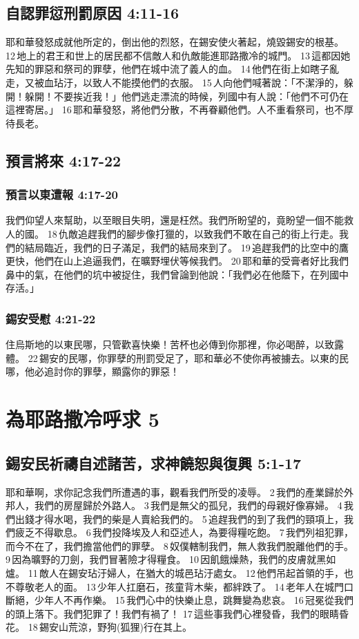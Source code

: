 \subsection{自認罪愆刑罰原因 4:11-16}
耶和華發怒成就他所定的，倒出他的烈怒，在錫安使火著起，燒毀錫安的根基。 12 地上的君王和世上的居民都不信敵人和仇敵能進耶路撒冷的城門。 13 這都因她先知的罪惡和祭司的罪孽，他們在城中流了義人的血。 14 他們在街上如瞎子亂走，又被血玷汙，以致人不能摸他們的衣服。 15 人向他們喊著說：「不潔淨的，躲開！躲開！不要挨近我！」他們逃走漂流的時候，列國中有人說：「他們不可仍在這裡寄居。」 16 耶和華發怒，將他們分散，不再眷顧他們。人不重看祭司，也不厚待長老。

\subsection{預言將來 4:17-22}
\subsubsection{預言以東遭報 4:17-20}
我們仰望人來幫助，以至眼目失明，還是枉然。我們所盼望的，竟盼望一個不能救人的國。 18 仇敵追趕我們的腳步像打獵的，以致我們不敢在自己的街上行走。我們的結局臨近，我們的日子滿足，我們的結局來到了。 19 追趕我們的比空中的鷹更快，他們在山上追逼我們，在曠野埋伏等候我們。 20 耶和華的受膏者好比我們鼻中的氣，在他們的坑中被捉住，我們曾論到他說：「我們必在他蔭下，在列國中存活。」

\subsubsection{錫安受慰 4:21-22}
住烏斯地的以東民哪，只管歡喜快樂！苦杯也必傳到你那裡，你必喝醉，以致露體。 22 錫安的民哪，你罪孽的刑罰受足了，耶和華必不使你再被擄去。以東的民哪，他必追討你的罪孽，顯露你的罪惡！

\section{為耶路撒冷呼求 5}
\subsection{錫安民祈禱自述諸苦，求神饒恕與復興  5:1-17}
耶和華啊，求你記念我們所遭遇的事，觀看我們所受的凌辱。 2 我們的產業歸於外邦人，我們的房屋歸於外路人。 3 我們是無父的孤兒，我們的母親好像寡婦。 4 我們出錢才得水喝，我們的柴是人賣給我們的。 5 追趕我們的到了我們的頸項上，我們疲乏不得歇息。 6 我們投降埃及人和亞述人，為要得糧吃飽。 7 我們列祖犯罪，而今不在了，我們擔當他們的罪孽。 8 奴僕轄制我們，無人救我們脫離他們的手。 9 因為曠野的刀劍，我們冒著險才得糧食。 10 因飢餓燥熱，我們的皮膚就黑如爐。 11 敵人在錫安玷汙婦人，在猶大的城邑玷汙處女。 12 他們吊起首領的手，也不尊敬老人的面。 13 少年人扛磨石，孩童背木柴，都絆跌了。 14 老年人在城門口斷絕，少年人不再作樂。 15 我們心中的快樂止息，跳舞變為悲哀。 16 冠冕從我們的頭上落下。我們犯罪了！我們有禍了！ 17 這些事我們心裡發昏，我們的眼睛昏花。 18 錫安山荒涼，野狗(狐狸)行在其上。

